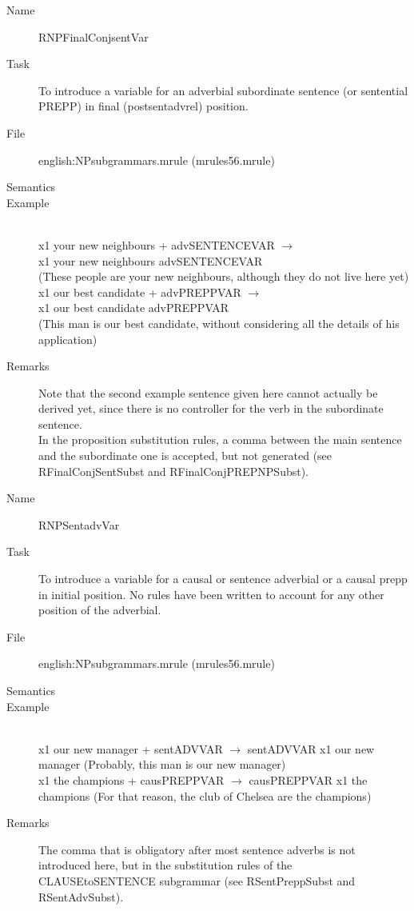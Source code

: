 \begin{description}
\begin{description}
\vspace{1 cm}
\begin{description}
\item[Name] RNPFinalConjsentVar
\item[Task] To introduce a variable for an adverbial subordinate sentence (or 
sentential PREPP) in final (postsentadvrel) position.
\item[File] english:NPsubgrammars.mrule (mrules56.mrule)
\item[Semantics]
\item[Example] \mbox{}\\
x1 your new neighbours + advSENTENCEVAR $\rightarrow$ \\
x1 your new neighbours advSENTENCEVAR \\
(These people are your new neighbours, although they do not live here yet)\\
x1 our best candidate + advPREPPVAR $\rightarrow$ \\
x1 our best candidate advPREPPVAR \\
(This man is our best candidate, without considering all the details of his 
application)
\item[Remarks] Note that the 
second example sentence given here cannot actually be derived yet, since there 
is no controller for the verb in the subordinate sentence. \\
In the proposition substitution rules, a comma between the main sentence and 
the subordinate one is accepted, but not generated (see RFinalConjSentSubst and 
RFinalConjPREPNPSubst).
\end{description}

\vspace{1 cm}
\begin{description}
\item[Name] RNPSentadvVar
\item[Task] To introduce a variable for a causal or sentence adverbial or a 
causal prepp in 
initial position. No rules have been written to account for any other position 
of the adverbial.
\item[File] english:NPsubgrammars.mrule (mrules56.mrule)
\item[Semantics]
\item[Example] \mbox{}\\
x1 our new manager + sentADVVAR $\rightarrow$ sentADVVAR x1 our new manager 
(Probably, this man is our new manager)\\
x1 the champions + causPREPPVAR $\rightarrow$ causPREPPVAR x1 the champions
(For that reason, the club of Chelsea are the champions)
\item[Remarks] The comma that is obligatory after most sentence adverbs 
is not introduced here, but in the substitution rules of 
the CLAUSEtoSENTENCE subgrammar (see RSentPreppSubst and RSentAdvSubst). \\
\end{description}


\end{description}
\end{description}
